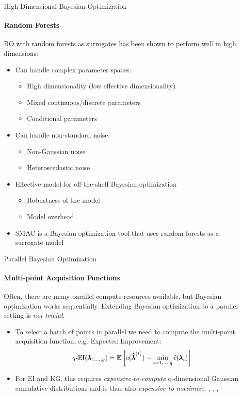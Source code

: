 \begin{frame}[c]{High Dimensional Bayesian Optimization}
\framesubtitle{Random Forests}
BO with random forests as surrogates has been shown to perform well in high dimensions:
\begin{itemize}
    \item Can handle complex parameter spaces:
    \begin{itemize}
        \item High dimensionality (low effective dimensionality)
        \item Mixed continuous/discrete parameters
        \item Conditional parameters
    \end{itemize}
\pause
\smallskip
    \item Can handle non-standard noise
    \begin{itemize}
        \item Non-Gaussian noise
        \item Heteroscedastic noise
    \end{itemize}
\pause
\smallskip
    \item Effective model for off-the-shelf Bayesian optimization
    \begin{itemize}
        \item Robustness of the model
        \item Model overhead
    \end{itemize}
\pause
\smallskip
    \item SMAC is a Bayesian optimization tool that uses random forests as a surrogate model
\end{itemize}
\end{frame}
\begin{frame}[c]{Parallel Bayesian Optimization}
\framesubtitle{Multi-point Acquisition Functions}

Often, there are many parallel compute resources available, but Bayesian optimization works sequentially. Extending Bayesian optimization to a parallel setting is \emph{not trivial}.
\pause
\begin{itemize}
    \item <+-> To select a batch of points in parallel we need to compute the multi-point acquisition function, e.g. Expected Improvement:
    \begin{equation*}
        q\text{-EI}(\pmb{\lambda}_{1, \dots, q}) = \operatorname*{\mathbb{E}} \left[ c({\pmb{\hat{\lambda}}}^{(t)}) - \min_{i=1, \dots, q} \hat{c}(\pmb{\lambda}_i) \right]
    \end{equation*}
    \item <+-> For EI and KG, this requires \emph{expensive-to-compute} q-dimensional Gaussian cumulative distributions and is thus also \emph{expensive to maximize}. , , , 
\end{itemize}
\pause
\end{frame}
